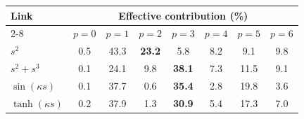 \begin{tabular}{@{}l*{7}{c}@{}}
\toprule
Link & \multicolumn{7}{c}{Effective contribution (\%)} \\
\cmidrule(lr){2-8}
 & $p=0$ & $p=1$ & $p=2$ & $p=3$ & $p=4$ & $p=5$ & $p=6$ \\
\midrule
\(s^2\) & 0.5 & 43.3 & \textbf{23.2} & 5.8 & 8.2 & 9.1 & 9.8 \\
\(s^2+s^3\) & 0.1 & 24.1 & 9.8 & \textbf{38.1} & 7.3 & 11.5 & 9.1 \\
\(\sin(\kappa s)\) & 0.1 & 37.7 & 0.6 & \textbf{35.4} & 2.8 & 19.8 & 3.6 \\
\(\tanh(\kappa s)\) & 0.2 & 37.9 & 1.3 & \textbf{30.9} & 5.4 & 17.3 & 7.0 \\
\bottomrule
\end{tabular}
